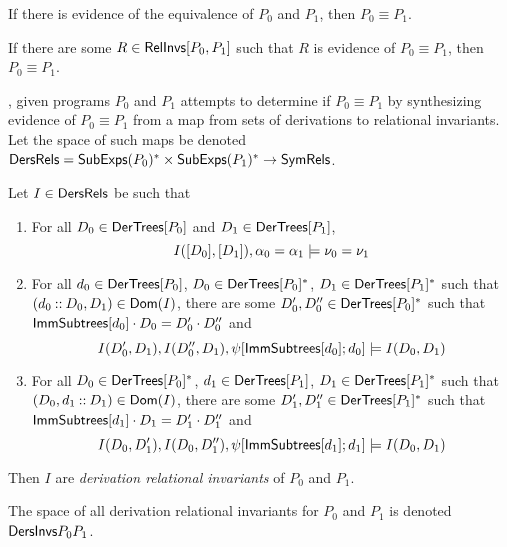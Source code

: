 \begin{ex}
  \label{ex:rel-invs}
\end{ex}

If there is evidence of the equivalence of $P_0$ and $P_1$, then $P_0
\equiv P_1$.
%
\begin{lemma}
  \label{lemma:equiv-evidence}
  If there are some $R \in \mathsf{RelInvs}[ P_0, P_1 ]$ such that $R$ is
  evidence of $P_0 \equiv P_1$, then $P_0 \equiv P_1$.
\end{lemma}

%
\sys, given programs $P_0$ and $P_1$ attempts to determine if $P_0
\equiv P_1$ by synthesizing evidence of $P_0 \equiv P_1$ from a map
from sets of derivations to relational invariants.
%
Let the space of such maps be denoted $\mathsf{DersRels} = \mathsf{SubExps}(P_0)^{*}
\times \mathsf{SubExps}(P_1)^{*} \to \mathsf{SymRels}$.
%
\begin{defn}
  \label{defn:der-rel-invs}
  Let $I \in \mathsf{DersRels}$ be such that %
  \begin{enumerate}
  \item 
    For all $D_0 \in \mathsf{DerTrees}[ P_0 ]$ and $D_1 \in \mathsf{DerTrees}[ P_1 ]$,
    \[ I([ D_0 ], [ D_1 ]), \alpha_0 = \alpha_1 \entails %
    \nu_0 = \nu_1 \]
  \item 
    For all $d_0 \in \mathsf{DerTrees}[ P_0 ]$, %
    $D_0 \in \mathsf{DerTrees}[ P_0 ]^{*}$, %
    $D_1 \in \mathsf{DerTrees}[ P_1 ]^{*}$ such that $(d_0 \mathbin{::} D_0, D_1) \in
    \mathsf{Dom}(I)$, %
    there are some $D_0', D_0'' \in \mathsf{DerTrees}[ P_0 ]^{*}$ such that
    $\mathsf{ImmSubtrees}[ d_0 ] \cdot D_0 = D_0' \cdot D_0''$ and %
    \[ I(D_0', D_1), I(D_0'', D_1), \psi[  \mathsf{ImmSubtrees}[  d_0  ]  ; 
      d_0  ] \models I(D_0, D_1) \]
  \item 
    For all $D_0 \in \mathsf{DerTrees}[ P_0 ]^{*}$, %
    $d_1 \in \mathsf{DerTrees}[ P_1 ]$, %
    $D_1 \in \mathsf{DerTrees}[ P_1 ]^{*}$ such that $(D_0, d_1 \mathbin{::} D_1) \in
    \mathsf{Dom}(I)$, %
    there are some $D_1', D_1'' \in \mathsf{DerTrees}[ P_1 ]^{*}$ such that
    $\mathsf{ImmSubtrees}[ d_1 ] \cdot D_1 = D_1' \cdot D_1''$ and %
    \[ I(D_0, D_1'), I(D_0, D_1''), \psi[  \mathsf{ImmSubtrees}[  d_1  ]  ; 
      d_1  ] \models I(D_0, D_1) \]
  \end{enumerate}
  Then $I$ are \emph{derivation relational invariants} of $P_0$ and
  $P_1$.
\end{defn}
%
The space of all derivation relational invariants for $P_0$ and $P_1$
is denoted $\mathsf{DersInvs}{P_0}{P_1}$.
%

